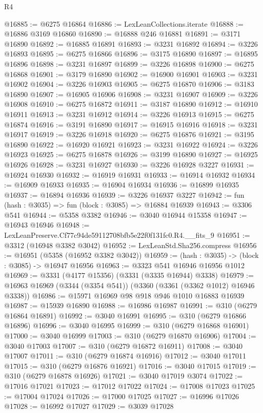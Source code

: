 \begin{lexlean}{R4}
\begin{coremodule}
@16885 := @6275 @16864
@16886 := LexLeanCollections.iterate
@16888 := @16886 @3169 @16860
@16890 := @16888 @246 @16881
@16891 := @3171 @16890
@16892 := @16885 @16891
@16893 := @3231 @16892
@16894 := @3226 @16893
@16895 := @6275 @16866
@16896 := @3175 @16890
@16897 := @16895 @16896
@16898 := @3231 @16897
@16899 := @3226 @16898
@16900 := @6275 @16868
@16901 := @3179 @16890
@16902 := @16900 @16901
@16903 := @3231 @16902
@16904 := @3226 @16903
@16905 := @6275 @16870
@16906 := @3183 @16890
@16907 := @16905 @16906
@16908 := @3231 @16907
@16909 := @3226 @16908
@16910 := @6275 @16872
@16911 := @3187 @16890
@16912 := @16910 @16911
@16913 := @3231 @16912
@16914 := @3226 @16913
@16915 := @6275 @16874
@16916 := @3191 @16890
@16917 := @16915 @16916
@16918 := @3231 @16917
@16919 := @3226 @16918
@16920 := @6275 @16876
@16921 := @3195 @16890
@16922 := @16920 @16921
@16923 := @3231 @16922
@16924 := @3226 @16923
@16925 := @6275 @16878
@16926 := @3199 @16890
@16927 := @16925 @16926
@16928 := @3231 @16927
@16930 := @3226 @16928 @3227
@16931 := @16924 @16930
@16932 := @16919 @16931
@16933 := @16914 @16932
@16934 := @16909 @16933
@16935 := @16904 @16934
@16936 := @16899 @16935
@16937 := @16894 @16936
@16939 := @3226 @16937 @3227
@16942 := fun (hash : @3035) => fun (block : @3085) => @16884 @16939
@16943 := @3306 @541
@16944 := @5358 @3382
@16946 := @3040 @16944 @15358
@16947 := @16943 @16946
@16948 := LexLeanPreserve.Cf77c94de59112708bfb5e22f0f131fc0.R4.__fits_9
@16951 := @3312 (@16948 @3382 @3042)
@16952 := LexLeanStd.Sha256.compress
@16956 := @16951 (@5358 (@16952 @3382 @3042))
@16959 := (hash : @3035) -> (block : @3085) -> @16947 @16956
@16963 := @3323 @541 @16946 @16956 @1012
@16969 := @3331 (@4177 @15356) (@3331 (@3335 @16944) @3338)
@16979 := @16963 @16969 (@3344 (@3354 @541)) (@3360 (@3361 (@3362 @1012) @16946 @3338))
@16986 := @15971 @16969 @98 @918 @946 @1010 @16883 @16939
@16987 := @15939 @16890
@16988 := @16986 @16987
@16991 := @310 (@6279 @16864 @16891)
@16992 := @3040 @16991
@16995 := @310 (@6279 @16866 @16896)
@16996 := @3040 @16995
@16999 := @310 (@6279 @16868 @16901)
@17000 := @3040 @16999
@17003 := @310 (@6279 @16870 @16906)
@17004 := @3040 @17003
@17007 := @310 (@6279 @16872 @16911)
@17008 := @3040 @17007
@17011 := @310 (@6279 @16874 @16916)
@17012 := @3040 @17011
@17015 := @310 (@6279 @16876 @16921)
@17016 := @3040 @17015
@17019 := @310 (@6279 @16878 @16926)
@17021 := @3040 @17019 @3074
@17022 := @17016 @17021
@17023 := @17012 @17022
@17024 := @17008 @17023
@17025 := @17004 @17024
@17026 := @17000 @17025
@17027 := @16996 @17026
@17028 := @16992 @17027
@17029 := @3039 @17028

\end{coremodule}
\end{lexlean}
